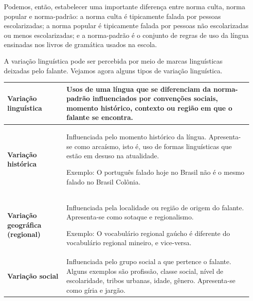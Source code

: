 {Podemos, então, estabelecer uma importante diferença entre norma culta,
norma popular e norma-padrão: a norma culta é tipicamente falada por
pessoas escolarizadas; a norma popular é tipicamente falada por pessoas
não escolarizadas ou menos escolarizadas; e a norma-padrão é o conjunto
de regras de uso da língua ensinadas nos livros de gramática usados na
escola.

A variação linguística pode ser percebida por meio de marcas
linguísticas deixadas pelo falante. Vejamos agora alguns tipos de
variação linguística.}

\begin{longtable}[]{@{}ll@{}}
\toprule
\begin{minipage}[b]{0.46\columnwidth}\raggedright
\textbf{Variação linguística}\strut
\end{minipage} & \begin{minipage}[b]{0.46\columnwidth}\raggedright
Usos de uma língua que se diferenciam da norma-padrão influenciados por
convenções sociais, momento histórico, contexto ou região em que o
falante se encontra.\strut
\end{minipage}\tabularnewline
\midrule
\endhead
\begin{minipage}[t]{0.46\columnwidth}\raggedright
\textbf{Variação histórica}\strut
\end{minipage} & \begin{minipage}[t]{0.46\columnwidth}\raggedright
Influenciada pelo momento histórico da língua. Apresenta-se como
arcaísmo, isto é, uso de formas linguísticas que estão em desuso na
atualidade.

Exemplo: O português falado hoje no Brasil não é o mesmo falado no
Brasil Colônia.\strut
\end{minipage}\tabularnewline
\begin{minipage}[t]{0.46\columnwidth}\raggedright
\textbf{Variação geográfica (regional)}\strut
\end{minipage} & \begin{minipage}[t]{0.46\columnwidth}\raggedright
Influenciada pela localidade ou região de origem do falante.
Apresenta-se como sotaque e regionalismo.

Exemplo: O vocabulário regional gaúcho é diferente do vocabulário
regional mineiro, e vice-versa.\strut
\end{minipage}\tabularnewline
\begin{minipage}[t]{0.46\columnwidth}\raggedright
\textbf{Variação social}\strut
\end{minipage} & \begin{minipage}[t]{0.46\columnwidth}\raggedright
Influenciada pelo grupo social a que pertence o falante. Alguns exemplos
são profissão, classe social, nível de escolaridade, tribos urbanas,
idade, gênero. Apresenta-se como gíria e jargão.


\end{minipage}
\end{longtable}
